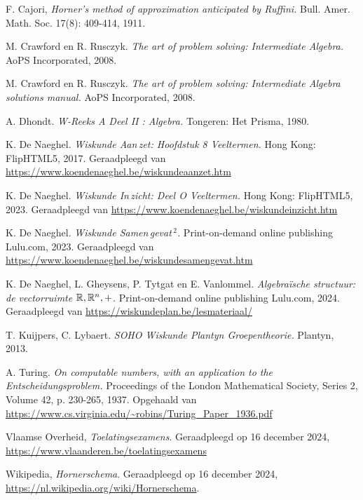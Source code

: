 \documentclass{ximera}
\begin{document}
{}
{}
\begin{thebibliography}{99}

F. Cajori, \textit{Horner's method of approximation anticipated by Ruffini.} Bull. Amer. Math. Soc. 17(8): 409-414, 1911.

M. Crawford en R. Rusczyk. \textit{The art of problem solving: Intermediate Algebra.} AoPS Incorporated, 2008.

M. Crawford en R. Rusczyk. \textit{The art of problem solving: Intermediate Algebra solutions manual.} AoPS Incorporated, 2008.

A. Dhondt. \textit{W-Reeks A Deel II : Algebra.} Tongeren: Het Prisma, 1980.

K. De Naeghel. \textit{Wiskunde Aan\,zet: Hoofdstuk 8 Veeltermen.} Hong Kong: FlipHTML5, 2017. Geraadpleegd van \url{https://www.koendenaeghel.be/wiskundeaanzet.htm}

K. De Naeghel. \textit{Wiskunde In\,zicht: Deel O Veeltermen.} Hong Kong: FlipHTML5, 2023. Geraadpleegd van \url{https://www.koendenaeghel.be/wiskundeinzicht.htm}

K. De Naeghel. \textit{Wiskunde Samen\,gevat\,${}^{2}$.} Print-on-demand online publishing Lulu.com, 2023. Geraadpleegd van \url{https://www.koendenaeghel.be/wiskundesamengevat.htm} 

K. De Naeghel, L. Gheysens, P. Tytgat en E. Vanlommel. \textit{Algebraïsche structuur: de vectorruimte $\mathbb{R},\mathbb{R}^n,+$.} Print-on-demand online publishing Lulu.com, 2024. Geraadpleegd van \url{https://wiskundeplan.be/lesmateriaal/}

T. Kuijpers, C. Lybaert. \textit{SOHO Wiskunde Plantyn Groepentheorie.} Plantyn, 2013.

A. Turing. \textit{On computable numbers, with an application to the Entscheidungsproblem.} Proceedings of the London Mathematical Society, Series 2, Volume 42, p. 230-265, 1937. 
Opgehaald van \url{https://www.cs.virginia.edu/~robins/Turing_Paper_1936.pdf}

Vlaamse Overheid, \textit{Toelatingsexamens}. Geraadpleegd op 16 december 2024, \url{https://www.vlaanderen.be/toelatingsexamens}

Wikipedia, \textit{Hornerschema}. Geraadpleegd op 16 december 2024, \url{https://nl.wikipedia.org/wiki/Hornerschema}.

\end{thebibliography}
\end{document}
